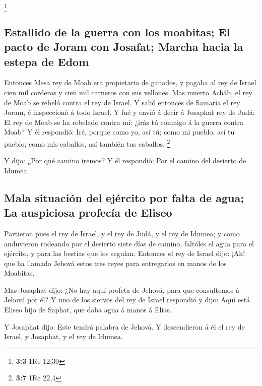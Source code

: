 \footnote{\textbf{3:3} 1Re 12,30}

\hypertarget{estallido-de-la-guerra-con-los-moabitas-el-pacto-de-joram-con-josafat-marcha-hacia-la-estepa-de-edom}{%
\subsection{Estallido de la guerra con los moabitas; El pacto de Joram
con Josafat; Marcha hacia la estepa de
Edom}\label{estallido-de-la-guerra-con-los-moabitas-el-pacto-de-joram-con-josafat-marcha-hacia-la-estepa-de-edom}}

 Entonces Mesa rey de Moab era propietario de ganados, y
pagaba al rey de Israel cien mil corderos y cien mil carneros con sus
vellones.  Mas muerto Achâb, el rey de Moab se rebeló contra
el rey de Israel.  Y salió entonces de Samaria el rey Joram,
é inspeccionó á todo Israel.  Y fué y envió á decir á
Josaphat rey de Judá: El rey de Moab se ha rebelado contra mí: ¿irás tú
conmigo á la guerra contra Moab? Y él respondió: Iré, porque como yo,
así tú; como mi pueblo, así tu pueblo; como mis caballos, así también
tus caballos. \footnote{\textbf{3:7} 1Re 22,4}

 Y dijo: ¿Por qué camino iremos? Y él respondió: Por el
camino del desierto de Idumea.

\hypertarget{mala-situaciuxf3n-del-ejuxe9rcito-por-falta-de-agua-la-auspiciosa-profecuxeda-de-eliseo}{%
\subsection{Mala situación del ejército por falta de agua; La auspiciosa
profecía de
Eliseo}\label{mala-situaciuxf3n-del-ejuxe9rcito-por-falta-de-agua-la-auspiciosa-profecuxeda-de-eliseo}}

 Partieron pues el rey de Israel, y el rey de Judá, y el rey
de Idumea; y como anduvieron rodeando por el desierto siete días de
camino, faltóles el agua para el ejército, y para las bestias que los
seguían.  Entonces el rey de Israel dijo: ¡Ah! que ha
llamado Jehová estos tres reyes para entregarlos en manos de los
Moabitas.

 Mas Josaphat dijo: ¿No hay aquí profeta de Jehová, para
que consultemos á Jehová por él? Y uno de los siervos del rey de Israel
respondió y dijo: Aquí está Eliseo hijo de Saphat, que daba agua á manos
á Elías.

 Y Josaphat dijo: Este tendrá palabra de Jehová. Y
descendieron á él el rey de Israel, y Josaphat, y el rey de Idumea.


